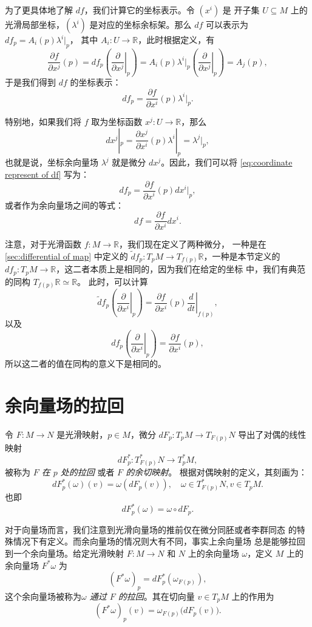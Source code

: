 \documentclass[fontset=none]{Notes}
\begin{document}
为了更具体地了解 $df$，我们计算它的坐标表示。令 $\left(x^i\right)$ 是
开子集 $U\subseteq M$ 上的光滑局部坐标，$\left(\lambda^i\right)$
是对应的坐标余标架。那么 $df$ 可以表示为 $df_p=A_i(p)\lambda^i|_p$，
其中 $A_i:U\to \mathbb{R}$，此时根据定义，有
\[
  \frac{\partial f}{\partial x^j}(p)=df_p\left(\left.\frac{\partial}{\partial x^j}\right|_p\right)
  =  A_i(p)\lambda^i|_p \left(\left.\frac{\partial}{\partial x^j}\right|_p\right)
  =A_j(p),
\]
于是我们得到 $df$ 的坐标表示：
\begin{equation}\label{eq:coordinate represent of df}
  df_p=\frac{\partial f}{\partial x^i}(p)\lambda^i|_p.
\end{equation}

特别地，如果我们将 $f$ 取为坐标函数 $x^j:U\to \mathbb{R}$，那么
\[
  dx^j|_p=  \frac{\partial x^j}{\partial x^i}(p)\lambda^i|_p
  =\lambda^j|_p,
\]
也就是说，坐标余向量场 $\lambda^j$ 就是微分 $dx^j$。因此，我们可以将
\eqref{eq:coordinate represent of df} 写为：
\[
  df_p=  \frac{\partial f}{\partial x^i}(p)dx^i|_p,
\]
或者作为余向量场之间的等式：
\begin{equation}
  df=\frac{\partial f}{\partial x^i}dx^i.
\end{equation}

注意，对于光滑函数 $f:M\to \mathbb{R}$，我们现在定义了两种微分，
一种是在 \ref{sec:differential of map} 中定义的
$\tilde{d}\!f_p:T_pM\to T_{f(p)}\mathbb{R}$，一种是本节定义的
$df_p:T_pM\to \mathbb{R}$，这二者本质上是相同的，因为我们在给定的坐标
中，我们有典范的同构 $T_{f(p)}\mathbb{R}\simeq \mathbb{R}$。
此时，可以计算
\[
  \tilde d\!f_p\left(\left.\frac{\partial}{\partial x^i}\right|_p\right)
  =\frac{\partial f}{\partial x^i}(p)\left.\frac{d}{dt}\right|_{f(p)},
\]
以及
\[
  df_p   \left(\left.\frac{\partial}{\partial x^i}\right|_p\right)
  =\frac{\partial f}{\partial x^i}(p),
\]
所以这二者的值在同构的意义下是相同的。

\section{余向量场的拉回}

令 $F:M\to N$ 是光滑映射，$p\in M$，微分 $dF_p:T_pM\to T_{F(p)}N$
导出了对偶的线性映射
\[
  dF_p^*:T_{F(p)}^*N\to T_p^*M,  
\]
被称为 \emph{$F$ 在 $p$ 处的拉回} 或者 \emph{$F$ 的余切映射}。
根据对偶映射的定义，其刻画为：
\[
  dF_p^*(\omega)(v)= \omega(dF_p(v)),\quad \omega\in T_{F(p)}^*N,
  v\in T_pM.
\]
也即
\[
  dF_p^*(\omega)=\omega\circ dF_p.  
\]

对于向量场而言，我们注意到光滑向量场的推前仅在微分同胚或者李群同态
的特殊情况下有定义。而余向量场的情况则大有不同，事实上余向量场
总是能够拉回到一个余向量场。给定光滑映射 $F:M\to N$ 和
$N$ 上的余向量场 $\omega$，定义 $M$ 上的余向量场 $F^*\omega$
为
\[
  (F^*\omega)_p =dF_p^*(\omega_{F(p)}),
\]
这个余向量场被称为\emph{$\omega$ 通过 $F$ 的拉回}。其在切向量 $v\in T_pM$
上的作用为
\[
  (F^*\omega)_p(v)=\omega_{F(p)}\bigl(dF_p(v)\bigr)  .
\]
\end{document}
